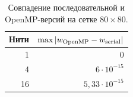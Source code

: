 \begin{table}[H]
\centering\small
\caption{Совпадение последовательной и OpenMP-версий на сетке $80\times80$.}
\begin{tabular}{rr}
\toprule
Нити & $\max|w_{\rm OpenMP}-w_{\rm serial}|$ \\
\midrule
1 & $0$ \\
4 & $6\cdot10^{-15}$ \\
16 & $5{,}33\cdot10^{-15}$ \\
\bottomrule
\end{tabular}
\end{table}
